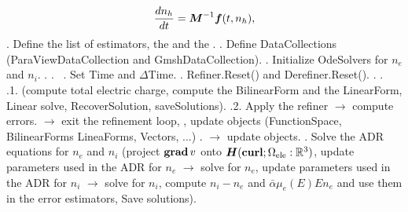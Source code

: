 \documentclass[review,hidelinks,onefignum,onetabnum]{siamart220329}
\begin{document}
{\begin{center}
\begin{algorithm}
\begin{algorithmic}
\begin{equation*}
              \frac{d n_h}{d t} = \boldsymbol{M}^{-1} \mbox{\boldmath$f$}(t, n_h),
            \end{equation*}
            \vspace{2mm}
            . Define the list of estimators, the  and the .
            \vspace{2mm}
            . Define DataCollections (ParaViewDataCollection and GmshDataCollection).
            \vspace{2mm}
            . Initialize OdeSolvers for $n_e$ and $n_i$.
            \vspace{2mm}
            . .
            \vspace{2mm}
                          \, 
              . Set Time and $\Delta$Time.
              \vspace{1mm}
              . Refiner.Reset() and Derefiner.Reset().
              \vspace{1mm}
              . .
              \vspace{1mm}
               \, 
                .1.  (compute total electric charge, compute the BilinearForm and the LinearForm, Linear solve, RecoverSolution, saveSolutions).          
              \vspace{1mm}
                .2. Apply the refiner $\longrightarrow$ compute errors.  $\longrightarrow$ exit the refinement loop, , update objects (FunctionSpace, BilinearForms LineaForms, Vectors, ...)
              \EndFor
              .  $\longrightarrow$ update objects.
              \vspace{1mm}
              . Solve the ADR equations for $n_e$ and $n_i$ (project $\Grad[]{v}$ onto $\Hcurl[]{\Omega_{\mathrm{ele}}:\mathbb{R}^3}$, update parameters used in the ADR for $n_e$ $\longrightarrow$ solve for $n_e$, update parameters used in the ADR for $n_i$ $\longrightarrow$ solve for $n_i$, compute $n_i - n_e$ and $\bar{\alpha} \mu_e(E) E n_e$ and use them in the error estimators, Save solutions).
            \EndFor
        \EndProcedure
      \end{algorithmic}
    \end{algorithm}
  \end{center}
}
%
\normalsize
%
%
 
% 
\end{document}
